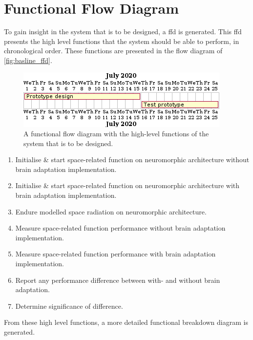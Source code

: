 \chapter{Functional Flow Diagram}\label{chap:baseline_ffd}
To gain insight in the system that is to be designed, a \acrlong{ffd} is generated. This \acrshort{ffd} presents the high level functions that the system should be able to perform, in chronological order. These functions are presented in the flow diagram of \cref{fig:basline_ffd}. 

\begin{figure}[H]
    \centering
    \includegraphics[width=0.6\linewidth]{latex/Images/Diagrams/trivial_gantt.png}
    \caption{A functional flow diagram with the high-level functions of the system that is to be designed.}
    \label{fig:baseline_ffd}
\end{figure}

\begin{enumerate}
    \item Initialise \& start space-related function on neuromorphic architecture without brain adaptation implementation.
    \item Initialise \& start space-related function on neuromorphic architecture with brain adaptation implementation.
    \item Endure modelled space radiation on neuromorphic architecture.
    \item Measure space-related function performance without brain adaptation implementation.
    \item Measure space-related function performance with brain adaptation implementation.
    \item Report any performance difference between with- and without brain adaptation.
    \item Determine significance of difference.
\end{enumerate}

From these high level functions, a more detailed functional breakdown diagram is generated.

